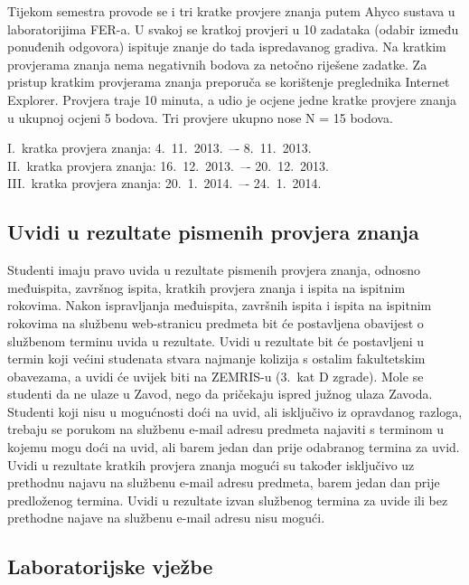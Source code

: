 \documentclass[times, 12pt, utf8]{book}
\begin{document}
Tijekom semestra provode se i tri kratke provjere znanja putem Ahyco sustava u laboratorijima FER-a.
U svakoj se kratkoj provjeri u 10 zadataka (odabir između ponuđenih odgovora) ispituje znanje do tada ispredavanog gradiva.
Na kratkim provjerama znanja nema negativnih bodova za netočno riješene zadatke.
Za pristup kratkim provjerama znanja preporuča se korištenje preglednika Internet Explorer.
Provjera traje 10 minuta, a udio je ocjene jedne kratke provjere znanja u ukupnoj ocjeni 5 bodova.
Tri provjere ukupno nose N = 15 bodova.


I.~kratka provjera znanja: 4.~11.~2013.~–- 8.~11.~2013. \\
II.~kratka provjera znanja: 16.~12.~2013.~–- 20.~12.~2013. \\
III.~kratka provjera znanja: 20.~1.~2014.~–- 24.~1.~2014.


\cleardoublepage  
{}  
{}
\subsection*{Uvidi u rezultate pismenih provjera znanja}

Studenti imaju pravo uvida u rezultate pismenih provjera znanja, odnosno međuispita, završnog ispita, kratkih provjera znanja i ispita na ispitnim rokovima.
Nakon ispravljanja međuispita, završnih ispita i ispita na ispitnim rokovima na službenu web-stranicu predmeta bit će postavljena obavijest o službenom terminu uvida u rezultate.
Uvidi u rezultate bit će postavljeni u termin koji većini studenata stvara najmanje kolizija s ostalim fakultetskim obavezama, a uvidi će uvijek biti na ZEMRIS-u (3.~kat D zgrade).
Mole se studenti da ne ulaze u Zavod, nego da pričekaju ispred južnog ulaza Zavoda.
Studenti koji nisu u mogućnosti doći na uvid, ali isključivo iz opravdanog razloga, trebaju se porukom na službenu e-mail adresu predmeta najaviti s terminom u kojemu mogu doći na uvid, ali barem jedan dan prije odabranog termina za uvid.
Uvidi u rezultate kratkih provjera znanja mogući su također isključivo uz prethodnu najavu na službenu e-mail adresu predmeta, barem jedan dan prije predloženog termina.
Uvidi u rezultate izvan službenog termina za uvide ili bez prethodne najave na službenu e-mail adresu nisu mogući.

\cleardoublepage  
{}  
{}
\subsection*{Laboratorijske vježbe}
\end{document}
